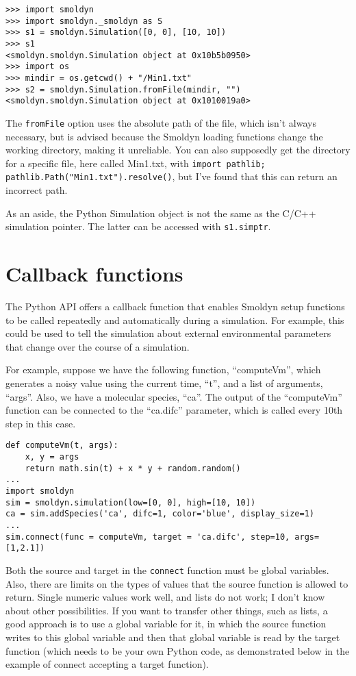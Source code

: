 \documentclass {scrbook}
\newcommand {\ttt} {\texttt}
\begin{document}
\begin{lstlisting}[style=SSAPython]
>>> import smoldyn
>>> import smoldyn._smoldyn as S
>>> s1 = smoldyn.Simulation([0, 0], [10, 10])
>>> s1
<smoldyn.smoldyn.Simulation object at 0x10b5b0950>
>>> import os
>>> mindir = os.getcwd() + "/Min1.txt"
>>> s2 = smoldyn.Simulation.fromFile(mindir, "")
<smoldyn.smoldyn.Simulation object at 0x1010019a0>
\end{lstlisting}

The \ttt{fromFile} option uses the absolute path of the file, which isn't always necessary, but is advised because the Smoldyn loading functions change the working directory, making it unreliable. You can also supposedly get the directory for a specific file, here called Min1.txt, with \ttt{import pathlib; pathlib.Path("Min1.txt").resolve()}, but I've found that this can return an incorrect path.

As an aside, the Python Simulation object is not the same as the C/C++ simulation pointer. The latter can be accessed with \ttt{s1.simptr}.

\section{Callback functions}

The Python API offers a callback function that enables Smoldyn setup functions to be called repeatedly and automatically during a simulation. For example, this could be used to tell the simulation about external environmental parameters that change over the course of a simulation.

For example, suppose we have the following function, ``computeVm'', which generates a noisy value using the current time, ``t'', and a list of arguments, ``args''. Also, we have a molecular species, ``ca''. The output of the ``computeVm'' function can be connected to the ``ca.difc'' parameter, which is called every 10th step in this case.

\begin{lstlisting}[style=SSAPython]
def computeVm(t, args):
    x, y = args
    return math.sin(t) + x * y + random.random()
...
import smoldyn
sim = smoldyn.simulation(low=[0, 0], high=[10, 10])
ca = sim.addSpecies('ca', difc=1, color='blue', display_size=1)
...
sim.connect(func = computeVm, target = 'ca.difc', step=10, args=[1,2.1])
\end{lstlisting}

Both the source and target in the \ttt{connect} function must be global variables. Also, there are limits on the types of values that the source function is allowed to return. Single numeric values work well, and lists do not work; I don't know about other possibilities. If you want to transfer other things, such as lists, a good approach is to use a global variable for it, in which the source function writes to this global variable and then that global variable is read by the target function (which needs to be your own Python code, as demonstrated below in the example of connect accepting a target function).
\end{document}
